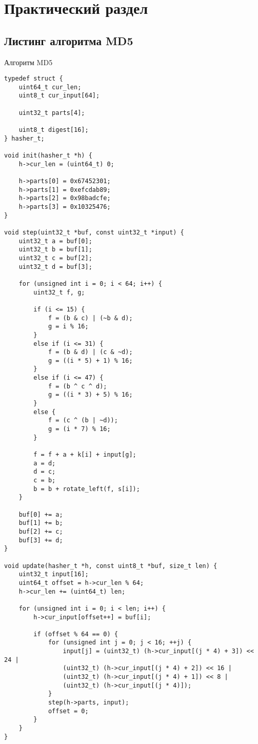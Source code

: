 \section{Практический раздел}

\subsection{Листинг алгоритма MD5}

\begin{listing}[!h]
	\caption{Алгоритм MD5}
	\begin{verbatim}
typedef struct {
	uint64_t cur_len;
	uint8_t cur_input[64];
	
	uint32_t parts[4];
	
	uint8_t digest[16];
} hasher_t;

void init(hasher_t *h) {
	h->cur_len = (uint64_t) 0;
	
	h->parts[0] = 0x67452301;
	h->parts[1] = 0xefcdab89;
	h->parts[2] = 0x98badcfe;
	h->parts[3] = 0x10325476;
}

void step(uint32_t *buf, const uint32_t *input) {
	uint32_t a = buf[0];
	uint32_t b = buf[1];
	uint32_t c = buf[2];
	uint32_t d = buf[3];
	
	for (unsigned int i = 0; i < 64; i++) {
		uint32_t f, g;
		
		if (i <= 15) {
			f = (b & c) | (~b & d);
			g = i % 16;
		}
		else if (i <= 31) {
			f = (b & d) | (c & ~d);
			g = ((i * 5) + 1) % 16;
		}
		else if (i <= 47) {
			f = (b ^ c ^ d);
			g = ((i * 3) + 5) % 16;
		}
		else {
			f = (c ^ (b | ~d));
			g = (i * 7) % 16;
		}
		
		f = f + a + k[i] + input[g];
		a = d;
		d = c;
		c = b;
		b = b + rotate_left(f, s[i]);
	}
	
	buf[0] += a;
	buf[1] += b;
	buf[2] += c;
	buf[3] += d;
}

void update(hasher_t *h, const uint8_t *buf, size_t len) {
	uint32_t input[16];
	uint64_t offset = h->cur_len % 64;
	h->cur_len += (uint64_t) len;
	
	for (unsigned int i = 0; i < len; i++) {
		h->cur_input[offset++] = buf[i];
		
		if (offset % 64 == 0) {
			for (unsigned int j = 0; j < 16; ++j) {
				input[j] = (uint32_t) (h->cur_input[(j * 4) + 3]) << 24 |
				(uint32_t) (h->cur_input[(j * 4) + 2]) << 16 |
				(uint32_t) (h->cur_input[(j * 4) + 1]) << 8 |
				(uint32_t) (h->cur_input[(j * 4)]);
			}
			step(h->parts, input);
			offset = 0;
		}
	}
}


\end{verbatim}
\end{listing}
